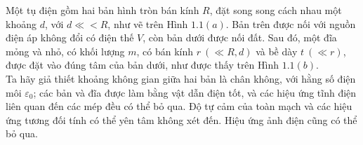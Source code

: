 \begin{vd}
Một tụ điện gồm hai bản hình tròn bán kính $R$, đặt song song cách nhau một khoảng $d$, với $d \ll<R$, như vẽ trên Hình $1.1(a)$. Bản trên được nối với nguồn điện áp không đổi có điện thế $V$, còn bản dưới được nối đất. Sau đó, một đĩa mỏng và nhỏ, có khối lượng $m$, có bán kính $r~ (\ll R, d)$ và bề dày $t ~(\ll r)$, được đặt vào đúng tâm của bản dưới, như được thấy trên Hình $1.1({b})$.\\
Ta hãy giả thiết khoảng không gian giữa hai bản là chân không, với hằng số điện môi $\varepsilon_{0}$; các bản và đĩa được làm bằng vật dẫn điện tốt, và các hiệu ứng tĩnh điện liên
quan đến các mép đều có thể bỏ qua. Độ tự cảm của toàn mạch và các hiệu ứng tương đối tính có thể yên tâm không xét đến. Hiệu ứng ảnh điện cũng có thể bỏ qua.
\begin{center}



\begin{tikzpicture}[x=0.75pt,y=0.75pt,yscale=-1,xscale=1]


\end{tikzpicture}
\end{center}
\end{vd}
